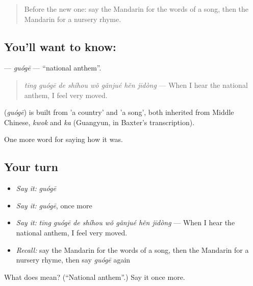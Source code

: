 \label{lesson:ZH-C504-guoge}



\begin{quote}
Before the new one: say the Mandarin for the words of a song, then the Mandarin for a nursery rhyme.
\end{quote}

\subsection*{You'll want to know: }
\textbf{} — \emph{guógē} — \textquotedblleft{}national anthem\textquotedblright{}.

\begin{quote}
\emph{tīng guógē de shíhou wǒ gǎnjué hěn jīdòng} — When I hear the national anthem, I feel very moved.
\end{quote}

\begin{cousinweb}
\textbf{} (\emph{guógē}) is built from  'a country' and  'a song', both inherited from Middle Chinese, \emph{kwok} and \emph{ka} (Guangyun, in Baxter's transcription).
\end{cousinweb}

\begin{grammarlens}[title={What you've built}]
One more word for saying how it was.
\end{grammarlens}

\subsection*{Your turn}
\begin{itemize}
\raggedright
  \item \emph{Say it:} \emph{guógē}
  \item \emph{Say it:} \emph{guógē}, once more
  \item \emph{Say it:} \emph{tīng guógē de shíhou wǒ gǎnjué hěn jīdòng} — When I hear the national anthem, I feel very moved.
  \item \emph{Recall:} say the Mandarin for the words of a song, then the Mandarin for a nursery rhyme, then say \emph{guógē} again
\end{itemize}

\begin{tcolorbox}[breakable,colback=teal!4,colframe=teal!35!black,title={Before you move on}]
What does  mean? (\textquotedblleft{}National anthem\textquotedblright{}.) Say it once more.
\end{tcolorbox}
